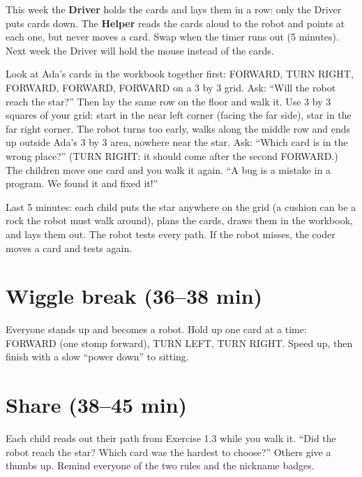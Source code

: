\begin{pairroles}
This week the \textbf{Driver} holds the cards and lays them in a row: only the Driver puts cards down. The \textbf{Helper} reads the cards aloud to the robot and points at each one, but never moves a card. Swap when the timer runs out (5 minutes). Next week the Driver will hold the mouse instead of the cards.
\end{pairroles}

\begin{bughunt}
Look at Ada's cards in the workbook together first: FORWARD, TURN RIGHT, FORWARD, FORWARD, FORWARD on a 3 by 3 grid. Ask: \enquote{Will the robot reach the star?} Then lay the same row on the floor and walk it. Use 3 by 3 squares of your grid: start in the near left corner (facing the far side), star in the far right corner. The robot turns too early, walks along the middle row and ends up outside Ada's 3 by 3 area, nowhere near the star. Ask: \enquote{Which card is in the wrong place?} (TURN RIGHT: it should come after the second FORWARD.) The children move one card and you walk it again. \enquote{A bug is a mistake in a program. We found it and fixed it!}
\end{bughunt}

\begin{freebuild}
Last 5 minutes: each child puts the star anywhere on the grid (a cushion can be a rock the robot must walk around), plans the cards, draws them in the workbook, and lays them out. The robot tests every path. If the robot misses, the coder moves a card and tests again.
\end{freebuild}

\section{Wiggle break (36--38 min)}
Everyone stands up and becomes a robot. Hold up one card at a time: FORWARD (one stomp forward), TURN LEFT, TURN RIGHT. Speed up, then finish with a slow \enquote{power down} to sitting.

\section{Share (38--45 min)}
\begin{teacherscript}
Each child reads out their path from Exercise 1.3 while you walk it. \enquote{Did the robot reach the star? Which card was the hardest to choose?} Others give a thumbs up. Remind everyone of the two rules and the nickname badges.
\end{teacherscript}

